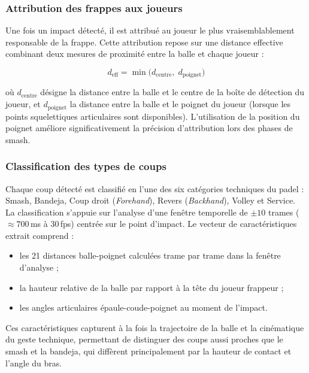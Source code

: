 \subsubsection{Attribution des frappes aux joueurs}

Une fois un impact détecté, il est attribué au joueur le plus vraisemblablement responsable
de la frappe. Cette attribution repose sur une distance effective combinant deux mesures de
proximité entre la balle et chaque joueur :

\begin{equation}
  d_{\mathrm{eff}} = \min\bigl(d_{\mathrm{centre}},\; d_{\mathrm{poignet}}\bigr)
  \label{eq:distance_effective}
\end{equation}

où $d_{\mathrm{centre}}$ désigne la distance entre la balle et le centre de la boîte de
détection du joueur, et $d_{\mathrm{poignet}}$ la distance entre la balle et le poignet du
joueur (lorsque les points squelettiques articulaires sont disponibles). L'utilisation de la
position du poignet améliore significativement la précision d'attribution lors des phases de
smash.

\subsubsection{Classification des types de coups}

Chaque coup détecté est classifié en l'une des six catégories techniques du padel :
Smash, Bandeja, Coup droit (\textit{Forehand}), Revers (\textit{Backhand}), Volley et
Service. La classification s'appuie sur l'analyse d'une fenêtre temporelle de
$\pm 10$ trames ($\approx 700$\,ms à 30\,fps) centrée sur le point d'impact. Le vecteur
de caractéristiques extrait comprend :

\begin{itemize}[leftmargin=1.5em]
  \item les 21 distances balle-poignet calculées trame par trame dans la fenêtre d'analyse ;
  \item la hauteur relative de la balle par rapport à la tête du joueur frappeur ;
  \item les angles articulaires épaule-coude-poignet au moment de l'impact.
\end{itemize}

Ces caractéristiques capturent à la fois la trajectoire de la balle et la cinématique du
geste technique, permettant de distinguer des coups aussi proches que le smash et la
bandeja, qui diffèrent principalement par la hauteur de contact et l'angle du bras.

